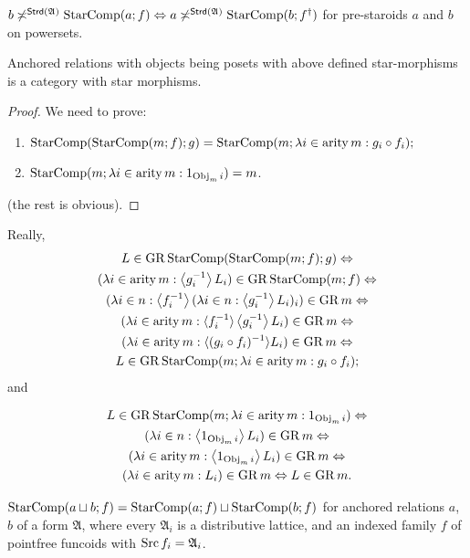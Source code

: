 \begin{conjecture}
$b\not\asymp^{\mathsf{Strd}(\mathfrak{A})}\operatorname{StarComp}(a;f)\Leftrightarrow a\not\asymp^{\mathsf{Strd}(\mathfrak{A})}\operatorname{StarComp}(b;f^{\dagger})$
for pre-staroids $a$ and $b$ on powersets.\end{conjecture}
\begin{prop}
Anchored relations with objects being posets with above defined star-morphisms
is a category with star morphisms.\end{prop}
\begin{proof}
We need to prove:
\begin{enumerate}
\item $\operatorname{StarComp}(\operatorname{StarComp}(m;f);g)=\operatorname{StarComp}(m;\lambda i\in\operatorname{arity} m:g_{i}\circ f_{i});$
\item $\operatorname{StarComp}(m;\lambda i\in\operatorname{arity} m:1_{\operatorname{Obj}_{m}i})=m$.
\end{enumerate}
(the rest is obvious).
\end{proof}
Really, 
\begin{multline*}
L\in\operatorname{GR}\operatorname{StarComp}(\operatorname{StarComp}(m;f);g)\Leftrightarrow\\
(\lambda i\in\operatorname{arity} m:\left\langle g_{i}^{-1}\right\rangle L_{i})\in\operatorname{GR}\operatorname{StarComp}(m;f)\Leftrightarrow\\
(\lambda i\in n:\left\langle f_{i}^{-1}\right\rangle(\lambda i\in n:\left\langle g_{i}^{-1}\right\rangle L_{i})_{i})\in\operatorname{GR} m\Leftrightarrow\\
(\lambda i\in\operatorname{arity} m:\langle f_{i}^{-1}\rangle\left\langle g_{i}^{-1}\right\rangle L_{i})\in\operatorname{GR} m\Leftrightarrow\\
(\lambda i\in\operatorname{arity} m:\langle(g_{i}\circ f_{i})^{-1}\rangle L_{i})\in\operatorname{GR} m\Leftrightarrow\\
L\in\operatorname{GR}\operatorname{StarComp}(m;\lambda i\in\operatorname{arity} m:g_{i}\circ f_{i});
\end{multline*}
and

\begin{multline*}
L\in\operatorname{GR}\operatorname{StarComp}(m;\lambda i\in\operatorname{arity} m:1_{\operatorname{Obj}_{m}i})\Leftrightarrow\\
(\lambda i\in n:\left\langle 1_{\operatorname{Obj}_{m}i}\right\rangle L_{i})\in\operatorname{GR} m\Leftrightarrow\\
(\lambda i\in\operatorname{arity} m:\left\langle 1_{\operatorname{Obj}_{m}i}\right\rangle L_{i})\in\operatorname{GR} m\Leftrightarrow\\
(\lambda i\in\operatorname{arity} m:L_{i})\in\operatorname{GR} m\Leftrightarrow L\in\operatorname{GR} m.
\end{multline*}

\begin{conjecture}
$\operatorname{StarComp}(a\sqcup b;f)=\operatorname{StarComp}(a;f)\sqcup\operatorname{StarComp}(b;f)$ for anchored
relations $a$, $b$ of a form $\mathfrak{A}$, where every $\mathfrak{A}_{i}$
is a distributive lattice, and an indexed family $f$ of pointfree
funcoids with $\operatorname{Src} f_{i}=\mathfrak{A}_{i}$.
\end{conjecture}


